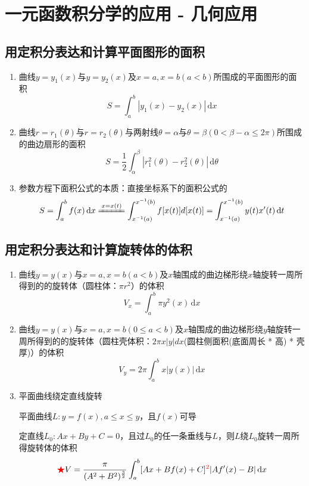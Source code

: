 \documentclass[../book.tex]{subfiles}
\begin{document}
    \section{一元函数积分学的应用 - 几何应用}

    \subsection{用定积分表达和计算平面图形的面积}

    \begin{enumerate}
        \item 曲线$y = y_1(x)$与$y = y_2(x)$及$x = a, x = b(a < b)$所围成的平面图形的面积
        \[
            S = \int_a^b |y_1(x) - y_2(x)|\,\mathrm{d}x
        \]
        \item 曲线$r = r_1(\theta)$与$r = r_2(\theta)$与两射线$\theta = \alpha$与$\theta = \beta(0 < \beta - \alpha \leq 2\pi)$所围成的曲边扇形的面积
        \[
            S = \frac{1}{2}\int_{\alpha}^{\beta} |r_1^2(\theta) - r_2^2(\theta)|\,\mathrm{d}\theta
        \]
        \item 参数方程下面积公式的本质：直接坐标系下的面积公式的\textbf{}
        \[
            S = \int_a^b f(x)\,\mathrm{d}x  \xlongequal{x = x(t)} \int_{x^{-1}(a)}^{x^{-1}(b)} f[x(t)]d[x(t)] = \int_{x^{-1}(a)}^{x^{-1}(b)} y(t)x'(t)\,\mathrm{d}t
        \]
    \end{enumerate}

    \subsection{用定积分表达和计算旋转体的体积}

    \begin{enumerate}
        \item 曲线$y = y(x)$与$x = a, x = b(a < b)$及$x$轴围成的曲边梯形绕$x$轴旋转一周所得到的的旋转体（圆柱体：$\pi r^2$）的体积
        \[
            V_x = \int_a^b \pi y^2(x)\,\mathrm{d}x
        \]
        \item 曲线$y = y(x)$与$x = a, x = b(0 \leq a < b)$及$x$轴围成的曲边梯形绕$y$轴旋转一周所得到的的旋转体（圆柱壳体积：$2\pi x|y| dx$(圆柱侧面积(底面周长 * 高) * 壳厚)）的体积
        \[
            V_y = 2\pi\int_a^b x|y(x)|\,\mathrm{d}x
        \]
        \item 平面曲线绕定直线旋转

        平面曲线$L: y = f(x), a \leq x \leq y$，且$f(x)$可导

        定直线$L_0: Ax + By + C = 0$，且过$L_0$的任一条垂线与$L${}，则$L$绕$L_0$旋转一周所得旋转体的体积
        \[
                {\color{red}{\bigstar}}V = \frac{\pi}{(A^2 + B^2)^{\frac{3}{2}}}\int_a^b [Ax + Bf(x) + C]^{\color{red}{2}}|Af'(x) - B|\,\mathrm{d}x
        \]
    \end{enumerate}
\end{document}
